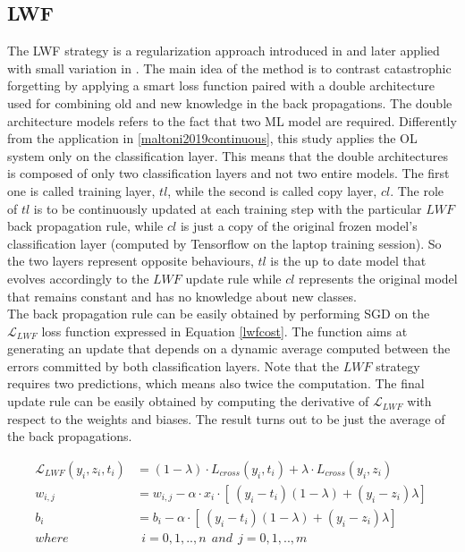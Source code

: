 \documentclass[12pt]{report}
\begin{document}
\subsection{LWF}
The LWF strategy is a regularization approach introduced in \autocite{li2017learning} and later applied with small variation in \autocite{maltoni2019continuous}. The main idea of the method is to contrast catastrophic forgetting by applying a smart loss function paired with a double architecture used for combining old and new knowledge in the back propagations. The double architecture models refers to the fact that two ML model are required. Differently from the application in \ref{maltoni2019continuous}, this study applies the OL system only on the classification layer. This means that the double architectures is composed of only two classification layers and not two entire models. The first one is called training layer, $tl$, while the second is called copy layer, $cl$. The role of $tl$ is to be continuously updated at each training step with the particular $LWF$ back propagation rule, while $cl$ is just a copy of the original frozen model's classification layer (computed by Tensorflow on the laptop training session). So the two layers represent opposite behaviours, $tl$ is the up to date model that evolves accordingly to the $LWF$ update rule while $cl$ represents the original model that remains constant and has no knowledge about new classes. \\
The back propagation rule can be easily obtained by performing SGD on the $\mathcal{L}_{LWF}$ loss function expressed in Equation \ref{lwfcost}. The function aims at generating an update that depends on a dynamic average computed between the errors committed by both classification layers. Note that the $LWF$ strategy requires two predictions, which means also twice the computation. The final update rule can be easily obtained by computing the derivative of $\mathcal{L}_{LWF}$ with respect to the weights and biases. The result turns out to be just the average of the back propagations.

\begin{align}
	\mathcal{L}_{LWF} ( y_i, z_i, t_i) &=  (1-\lambda) \cdot{L}_{cross}(y_i, t_i) + \lambda \cdot{L}_{cross}(y_i, z_i) \label{lwfcost}\\
	w_{i,j} &= w_{i,j} - \alpha \cdot x_i \cdot [\ (y_i - t_i)(1-\lambda) + (y_i - z_i)\lambda ]\  \\
	b_i     &= b_i - \alpha \cdot [\ (y_i - t_i)(1-\lambda) + (y_i - z_i)\lambda ]\ \\
    where   & \: \: i= 0,1,..,n  \: \: and \: \:  j=0,1,..,m \nonumber  
\end{align}
\end{document}
